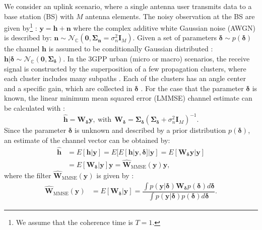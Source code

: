 \documentclass[12pt, draftclsnofoot, onecolumn]{IEEEtran}
\begin{document}
We consider an uplink scenario, where a single antenna user transmits data to a base station (BS) with $M$ antenna elements. The noisy observation at the BS are given by\footnote{We assume that the coherence time is $T=1$.} \cite{Neumann, Hellings, Koller}: $\mathbf{y} = \mathbf{h} + \mathbf{n}$ where the complex additive white Gaussian noise (AWGN) is described by:
$\mathbf{n} \sim \mathcal{N}_\mathbb{C}(\mathbf{0},\mathbf{\Sigma}_\mathbf{n} = \sigma_n^2 \mathbf{I}_M).$ Given a set of parameters $\boldsymbol{\delta} \sim p(\boldsymbol{\delta})$ the channel $\mathbf{h}$ is assumed to be conditionally Gaussian distributed \cite{Neumann,Hellings,Koller}: $\mathbf{h}|\boldsymbol{\delta} \sim \mathcal{N}_\mathbb{C}( \mathbf{0},\mathbf{\Sigma}_{\boldsymbol{\delta}}).
$ In the 3GPP urban (micro or macro) scenarios, the receive signal is constructed by the superposition of a few propagation clusters, where each cluster includes many subpaths \cite{Neumann,Hellings,Koller}. Each of the clusters has an angle center and a specific gain, which are collected in $\boldsymbol{\delta}$ \cite{Neumann,Hellings,Koller}. For the case that the parameter ${\boldsymbol{\delta}}$ is known, the linear minimum mean squared error (LMMSE) channel estimate can be calculated with \cite{Neumann,Hellings,Koller}:
\begin{equation}
    \hat{\mathbf{h}} = \mathbf{W}_{\boldsymbol{\delta}} \mathbf{y}, \ \text{with} \ \ 
    \mathbf{W}_{\boldsymbol{\delta}} = \mathbf{\Sigma}_{\boldsymbol{\delta}} (\mathbf{\Sigma}_{\boldsymbol{\delta}} + \sigma_n^2 \mathbf{I}_M )^{-1}.
    \label{LCEsampleFilter}
\end{equation}
Since the parameter ${\boldsymbol{\delta}}$ is unknown and described by a prior distribution $p({\boldsymbol{\delta}})$, an estimate of the channel vector can be obtained by\cite{Neumann,Hellings,Koller}:
\begin{align}
        \hat{\mathbf{h}} 
        &= E[\mathbf{h}|\mathbf{y}] = E[E[\mathbf{h}|\mathbf{y},{\boldsymbol{\delta}}]|\mathbf{y}] = E[\mathbf{W}_{\boldsymbol{\delta}} \mathbf{y} | \mathbf{y}]\\
        &= E[\mathbf{W}_{\boldsymbol{\delta}} | \mathbf{y}] \mathbf{y} = \hat{\mathbf{W}}_{\text{MMSE}}(\mathbf{y}) \mathbf{y},
\end{align}
where the filter $\hat{\mathbf{W}}_{\text{MMSE}}(\mathbf{y})$ is given by \cite{Neumann,Hellings,Koller}:
\begin{align}
    \hat{\mathbf{W}}_{\text{MMSE}}(\mathbf{y}) 
    &= E[\mathbf{W}_{\boldsymbol{\delta}} | \mathbf{y}] = \dfrac{\int p(\mathbf{y|{\boldsymbol{\delta}}}) \mathbf{W}_{\boldsymbol{\delta}} p(\boldsymbol{\delta}) d{\boldsymbol{\delta}}}{\int p(\mathbf{y|{\boldsymbol{\delta}}}) p(\boldsymbol{\delta}) d{\boldsymbol{\delta}}}.
\end{align}
\end{document}
